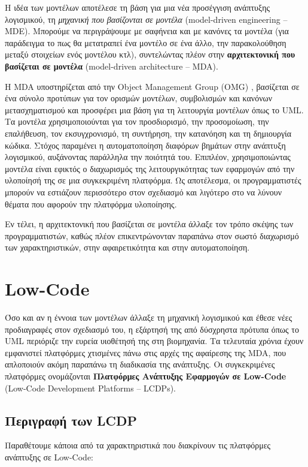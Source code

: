             Η ιδέα των μοντέλων αποτέλεσε τη βάση για μια νέα προσέγγιση ανάπτυξης λογισμικού, τη \textit{μηχανική που βασίζονται σε μοντέλα} (model-driven engineering -- MDE). Μπορούμε να περιγράψουμε με σαφήνεια και με κανόνες τα μοντέλα (για παράδειγμα το πως θα μετατραπεί ένα μοντέλο σε ένα άλλο, την παρακολούθηση μεταξύ στοιχείων ενός μοντέλου κτλ), συντελώντας πλέον στην \textbf{αρχιτεκτονική που βασίζεται σε μοντέλα} (model-driven architecture -- MDA).

            Η MDA υποστηρίζεται από την Object Management Group (OMG) \cite{OMG_MDA}, βασίζεται σε ένα σύνολο προτύπων για τον ορισμών μοντέλων, συμβολισμών και κανόνων μετασχηματισμού και προσφέρει μια βάση για τη λειτουργία μοντέλων όπως το UML. Τα μοντέλα χρησιμοποιούνται για τον προσδιορισμό, την προσομοίωση, την επαλήθευση, τον εκσυγχρονισμό, τη συντήρηση, την κατανόηση και τη δημιουργία κώδικα. Στόχος παραμένει η αυτοματοποίηση διαφόρων βημάτων στην ανάπτυξη λογισμικού, αυξάνοντας παράλληλα την ποιότητά του. Επιπλέον, χρησιμοποιώντας μοντέλα είναι εφικτός ο διαχωρισμός της λειτουργικότητας των εφαρμογών από την υλοποίησή της σε μια συγκεκριμένη πλατφόρμα. Ως αποτέλεσμα, οι προγραμματιστές μπορούν να εστιάζουν περισσότερο στον σχεδιασμό και λιγότερο στο να λύνουν θέματα που αφορούν την πλατφόρμα υλοποίησης.

            Εν τέλει, η αρχιτεκτονική που βασίζεται σε μοντέλα άλλαξε τον τρόπο σκέψης των προγραμματιστών, καθώς πλέον επικεντρώνονταν παραπάνω στον σωστό διαχωρισμό των χαρακτηριστικών, στην αφαιρετικότητα και στην αυτοματοποίηση.
            \cite{Bucaioni2022, MDELow, MDSDSpringer}

    \section{Low-Code}
        Όσο και αν η έννοια των μοντέλων άλλαξε τη μηχανική λογισμικού και έθεσε νέες προδιαγραφές στον σχεδιασμό του, η εξάρτησή της από δύσχρηστα πρότυπα όπως το UML περιόριζε την ευρεία υιοθέτησή της στη βιομηχανία. Τα τελευταία χρόνια έχουν εμφανιστεί πλατφόρμες χτισμένες πάνω στις αρχές της αφαίρεσης της MDA, που απλοποιούν ακόμη παραπάνω τη διαδικασία της ανάπτυξης. Οι συγκεκριμένες πλατφόρμες ονομάζονται \textbf{Πλατφόρμες Ανάπτυξης Εφαρμογών σε Low-Code} (Low-Code Development Platforms -- LCDPs).

        \subsection{Περιγραφή των LCDP}
            Παραθέτουμε κάποια από τα χαρακτηριστικά που διακρίνουν τις πλατφόρμες ανάπτυξης σε Low-Code:

